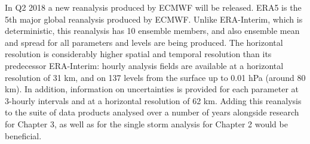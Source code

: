 In Q2 2018 a new reanalysis produced by ECMWF will be released. ERA5 is the 5th major global reanalysis produced by ECMWF. Unlike ERA-Interim, which is deterministic, this reanalysis has 10 ensemble members, and also ensemble mean and spread for all parameters and levels are being produced. The horizontal resolution is considerably higher spatial and temporal resolution than its predecessor ERA-Interim: hourly analysis fields are available at a horizontal resolution of 31 km, and on 137 levels from the surface up to 0.01 hPa (around 80 km). In addition, information on uncertainties is provided for each parameter at 3-hourly intervals and at a horizontal resolution of 62 km.
Adding this reanalysis to the suite of data products analysed over a number of years alongside research for Chapter 3, as well as for the single storm analysis for Chapter 2 would be beneficial.





%






